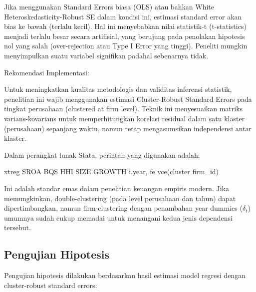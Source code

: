 \documentclass[12pt,a4paper]{report}
\begin{document}
Jika menggunakan Standard Errors biasa (OLS) atau bahkan White
Heteroskedasticity-Robust SE dalam kondisi ini, estimasi standard error
akan bias ke bawah (terlalu kecil). Hal ini menyebabkan nilai
statistik-t (t-statistics) menjadi terlalu besar secara artifisial, yang
berujung pada penolakan hipotesis nol yang salah (over-rejection atau
Type I Error yang tinggi). Peneliti mungkin menyimpulkan suatu variabel
signifikan padahal sebenarnya tidak.

Rekomendasi Implementasi:

Untuk meningkatkan kualitas metodologis dan validitas inferensi
statistik, penelitian ini wajib menggunakan estimasi Cluster-Robust
Standard Errors pada tingkat perusahaan (clustered at firm level).
Teknik ini menyesuaikan matriks varians-kovarians untuk memperhitungkan
korelasi residual dalam satu klaster (perusahaan) sepanjang waktu, namun
tetap mengasumsikan independensi antar klaster.

Dalam perangkat lunak Stata, perintah yang digunakan adalah:

xtreg SROA BQS HHI SIZE GROWTH i.year, fe vce(cluster firm\_id)

Ini adalah standar emas dalam penelitian keuangan empiris modern. Jika
memungkinkan, double-clustering (pada level perusahaan dan tahun) dapat
dipertimbangkan, namun firm-clustering dengan penambahan year dummies
(\(\delta_t\)) umumnya sudah cukup memadai untuk menangani kedua jenis
dependensi tersebut.

\hypertarget{pengujian-hipotesis}{%
\subsection{Pengujian Hipotesis}\label{pengujian-hipotesis}}

Pengujian hipotesis dilakukan berdasarkan hasil estimasi model regresi
dengan cluster-robust standard errors:
\end{document}
